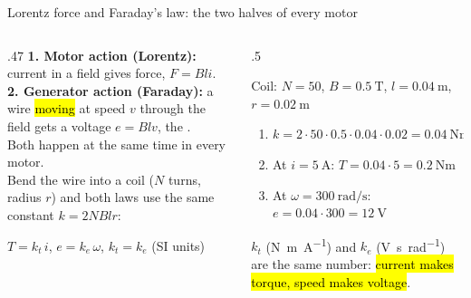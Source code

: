 \documentclass[aspectratio=169,10pt]{beamer}
\begin{document}
\begin{frame}{Lorentz force and Faraday's law: the two halves of every motor}
\begin{columns}[T]
\begin{column}{.47\textwidth}
\small
\textbf{1. Motor action (Lorentz):} current in a field gives force, $F=Bli$.\\[1mm]
\textbf{2. Generator action (Faraday):} a wire \hl{moving} at speed $v$ through the field gets a voltage $e=Blv$, the .\\[1mm]
Both happen at the same time in every motor.\\[2mm]
Bend the wire into a coil ($N$ turns, radius $r$) and both laws use the same constant $k=2NBlr$:
\begin{eqbox}
$T=k_t\,i$, \qquad $e=k_e\,\omega$, \qquad $k_t=k_e$ (SI units)
\end{eqbox}
\end{column}
\begin{column}{.5\textwidth}
\begin{defbox}
\small
Coil: $N=50$, $B=\SI{0.5}{\tesla}$, $l=\SI{0.04}{\metre}$, $r=\SI{0.02}{\metre}$
\begin{enumerate}\setlength\itemsep{1pt}
\item $k=2\cdot50\cdot0.5\cdot0.04\cdot0.02=\SI{0.04}{\newton\metre\per\ampere}$
\item At $i=\SI{5}{\ampere}$: $T=0.04\cdot5=\SI{0.2}{\newton\metre}$
\item At $\omega=\SI{300}{\radian\per\second}$: $e=0.04\cdot300=\SI{12}{\volt}$
\end{enumerate}
\end{defbox}
\begin{keybox}
\small
{} $k_t$ (\si{\newton\metre\per\ampere}) and  $k_e$ (\si{\volt\second\per\radian}) are the same number: \hl{current makes torque, speed makes voltage}.
\end{keybox}
\end{column}
\end{columns}
\end{frame}
\end{document}
